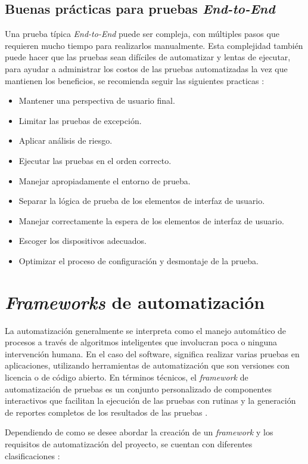 \subsection{Buenas prácticas para pruebas \emph{End-to-End}}
Una prueba típica \emph{End-to-End} puede ser compleja, con múltiples pasos que
requieren mucho tiempo para realizarlos manualmente. Esta complejidad también
puede hacer que las pruebas sean difíciles de automatizar y lentas de ejecutar,
para ayudar a administrar los costos de las pruebas automatizadas  la vez que
mantienen los beneficios, se recomienda seguir las siguientes practicas
\parencite{King}:

\begin{itemize}
    \item Mantener una perspectiva de usuario final.
    \item Limitar las pruebas de excepción.
    \item Aplicar análisis de riesgo.
    \item Ejecutar las pruebas en el orden correcto.
    \item Manejar apropiadamente el entorno de prueba.
    \item Separar la lógica de prueba de los elementos de interfaz de usuario.
    \item Manejar correctamente la espera de los elementos de interfaz de
        usuario.
    \item Escoger los dispositivos adecuados.
    \item Optimizar el proceso de configuración y desmontaje de la prueba.
\end{itemize}

\section{\emph{Frameworks} de automatización}
La automatización generalmente se interpreta como el manejo automático de
procesos a través de algoritmos inteligentes que involucran poca o ninguna
intervención humana. En el caso del software, significa realizar varias pruebas
en aplicaciones, utilizando herramientas de automatización que son
versiones con licencia o de código abierto. En términos técnicos, el
\emph{framework} de automatización de pruebas es un conjunto personalizado de
componentes interactivos que facilitan la ejecución de las pruebas con rutinas y
la generación de reportes completos de los resultados de las pruebas
\parencite{Techlabs}.

Dependiendo de como se desee abordar la creación de un \emph{framework} y los
requisitos de automatización del proyecto, se cuentan con diferentes
clasificaciones \parencite{Nguyen}:

